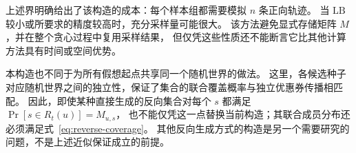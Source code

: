 上述界明确给出了该构造的成本：每个样本组都需要模拟 $n$ 条正向轨迹。
当 $\mathrm{LB}$ 较小或所要求的精度较高时，充分采样量可能很大。
该方法避免显式存储矩阵 $M$，并在整个贪心过程中复用采样结果，
但仅凭这些性质还不能断言它比其他计算方法具有时间或空间优势。

本构造也不同于为所有假想起点共享同一个随机世界的做法。
这里，各候选种子对应随机世界之间的独立性，保证了集合的联合覆盖概率与独立优惠券传播相匹配。
因此，即使某种直接生成的反向集合对每个 $s$ 都满足 $\Pr[s\in R_t(u)]=M_{u,s}$，
也不能仅凭这一点替换当前构造；其联合成员分布还必须满足式~\eqref{eq:reverse-coverage}。
其他反向生成方式的构造是另一个需要研究的问题，不是上述近似保证成立的前提。
